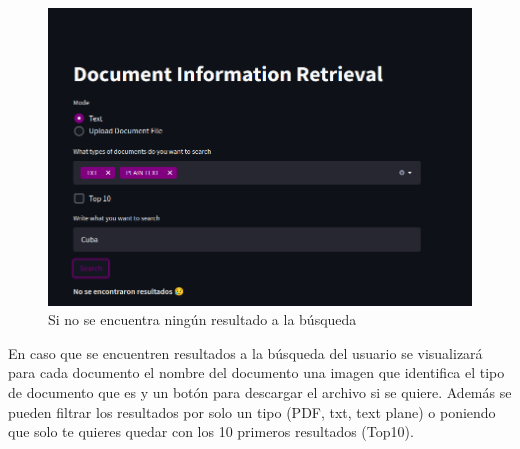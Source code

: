 \documentclass{llncs}
\begin{document}
\begin{figure}
    \caption{Si no se encuentra ningún resultado a la búsqueda}
    \includegraphics[scale = .28]{./images/ui_notfouund.png}
\end{figure}

En caso que se encuentren resultados a la búsqueda del usuario 
se visualizará para cada documento el nombre del documento 
una imagen que identifica el tipo de documento que es y un botón
para descargar el archivo si se quiere. Además se pueden filtrar 
los resultados por solo un tipo (PDF, txt, text plane) o poniendo 
que solo te quieres quedar con los 10 primeros resultados (Top10).
\end{document}
